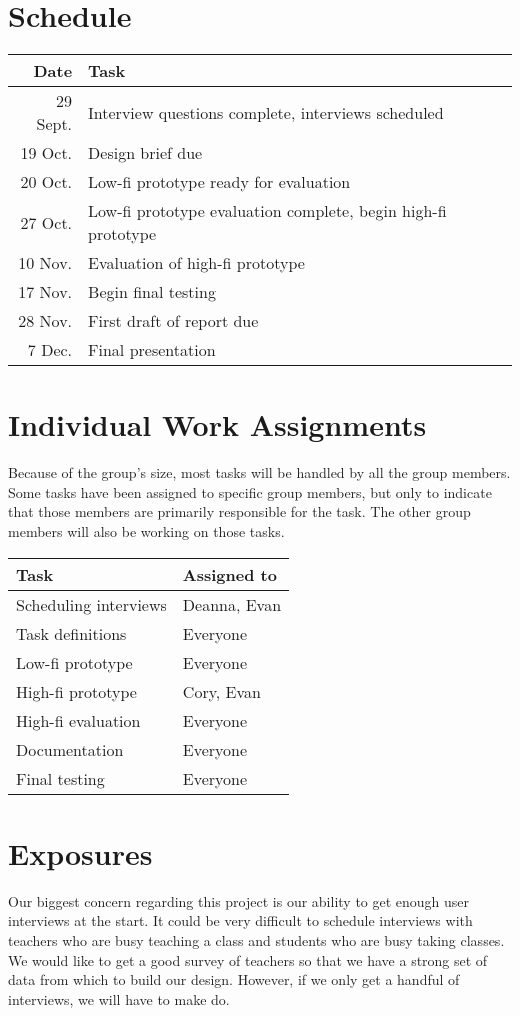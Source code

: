 \documentclass[11pt,letter]{article}
\begin{document}
\section{Schedule}
\begin{tabular}[!h]{rl}
	\textbf{Date} & \textbf{Task} \\
	\hline
	29 Sept. & Interview questions complete, interviews scheduled \\
	19 Oct.  & Design brief due \\
	20 Oct.  & Low-fi prototype ready for evaluation \\
	27 Oct.  & Low-fi prototype evaluation complete, begin high-fi prototype \\
	10 Nov.  & Evaluation of high-fi prototype \\
	17 Nov.  & Begin final testing \\
	28 Nov.  & First draft of report due \\
	7 Dec.   & Final presentation
\end{tabular}

\section{Individual Work Assignments}
Because of the group's size, most tasks will be handled by all the group
members. Some tasks have been assigned to specific group members, but only to
indicate that those members are primarily responsible for the task. The other
group members will also be working on those tasks.

\hfill
\linebreak
\begin{tabular}[!h]{ll}
	\textbf{Task}         & \textbf{Assigned to} \\
	\hline
	Scheduling interviews & Deanna, Evan \\
	Task definitions      & Everyone \\
	Low-fi prototype      & Everyone \\
	High-fi prototype     & Cory, Evan \\
	High-fi evaluation    & Everyone \\
	Documentation         & Everyone \\
	Final testing         & Everyone
\end{tabular}

\section{Exposures}
Our biggest concern regarding this project is our ability to get enough user
interviews at the start. It could be very difficult to schedule interviews with
teachers who are busy teaching a class and students who are busy taking classes.
We would like to get a good survey of teachers so that we have a strong set of
data from which to build our design. However, if we only get a handful of
interviews, we will have to make do.
\end{document}

